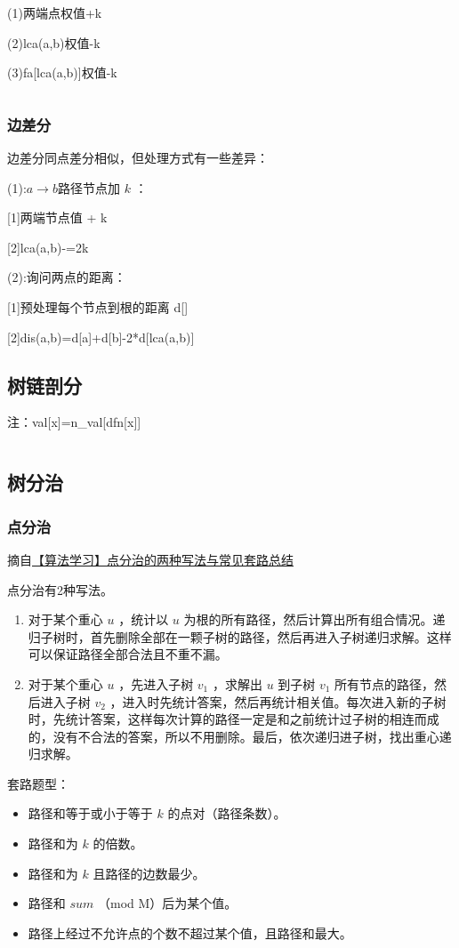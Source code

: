 \documentclass[a4paper,11pt]{article}
\begin{document}
(1)两端点权值+k

(2)lca(a,b)权值-k

(3)fa{[}lca(a,b){]}权值-k
\inputminted[linenos]{c++}{graph/chafendian.cpp}
\subsubsection{边差分}
边差分同点差分相似，但处理方式有一些差异：

\noindent (1):\(a \to b\)路径节点加 \(k\) ：

[1]两端节点值 + k

[2]lca(a,b)-=2k

\noindent (2):询问两点的距离：

[1]预处理每个节点到根的距离 d{[}{]}

[2]dis(a,b)=d{[}a{]}+d{[}b{]}-2*d{[}lca(a,b){]}
\subsection{树链剖分}
注：val[x]=n\_val[dfn[x]]
\inputminted[linenos]{c++}{graph/shulianpoufen.cpp}
\subsection{树分治}
\subsubsection{点分治}
摘自\href{https://blog.csdn.net/pengwill97/article/details/82562239}{【算法学习】点分治的两种写法与常见套路总结}

点分治有2种写法。

\begin{enumerate}
\def\labelenumi{\arabic{enumi}.}
\item
  对于某个重心 \(u\) ，统计以 \(u\)
  为根的所有路径，然后计算出所有组合情况。递归子树时，首先删除全部在一颗子树的路径，然后再进入子树递归求解。这样可以保证路径全部合法且不重不漏。
\item
  对于某个重心 \(u\) ，先进入子树 \(v_1\) ，求解出 \(u\) 到子树 \(v_1\)
  所有节点的路径，然后进入子树 \(v_2\)
  ，进入时先统计答案，然后再统计相关值。每次进入新的子树时，先统计答案，这样每次计算的路径一定是和之前统计过子树的相连而成的，没有不合法的答案，所以不用删除。最后，依次递归进子树，找出重心递归求解。 
\end{enumerate}

套路题型：

\begin{itemize}
\item
  路径和等于或小于等于 \(k\) 的点对（路径条数）。
\item
  路径和为 \(k\) 的倍数。
\item
  路径和为 \(k\) 且路径的边数最少。
\item
  路径和 \(sum\) （mod M）后为某个值。
\item
  路径上经过不允许点的个数不超过某个值，且路径和最大。
\end{itemize}
\end{document}
